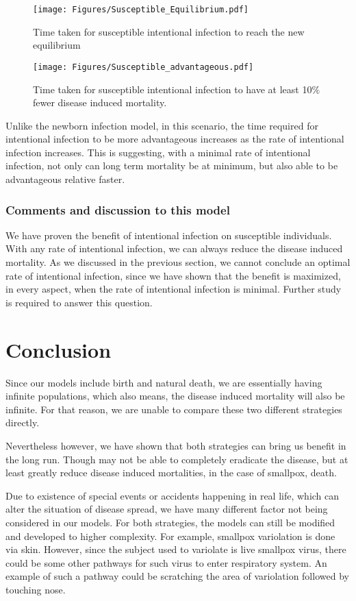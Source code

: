 \documentclass[12pt]{article}
\begin{document}
\begin{figure}[H]
  \centering
  \texttt{[image: Figures/Susceptible\_Equilibrium.pdf]}
  \caption{Time taken for susceptible intentional infection to reach the new equilibrium}
\end{figure}

\begin{figure}[H]
  \centering
  \texttt{[image: Figures/Susceptible\_advantageous.pdf]}
  \caption{Time taken for susceptible intentional infection to have at least 10$\%$ fewer disease induced mortality.}
\end{figure}

Unlike the newborn infection model, in this scenario, the time required for intentional infection to be more advantageous increases as the rate of intentional infection increases. This is suggesting, with a minimal rate of intentional infection, not only can long term mortality be at minimum, but also able to be advantageous relative faster.
\subsubsection{Comments and discussion to this model}
We have proven the benefit of intentional infection on susceptible individuals. With any rate of intentional infection, we can always reduce the disease induced mortality. As we discussed in the previous section, we cannot conclude an optimal rate of intentional infection, since we have shown that the benefit is maximized, in every aspect, when the rate of intentional infection is minimal. Further study is required to answer this question.
\section{Conclusion}
Since our models include birth and natural death, we are essentially having infinite populations, which also means, the disease induced mortality will also be infinite. For that reason, we are unable to compare these two different strategies directly.

Nevertheless however, we have shown that both strategies can bring us benefit in the long run. Though may not be able to completely eradicate the disease, but at least greatly reduce disease induced mortalities, in the case of smallpox, death.

Due to existence of special events or accidents happening in real life, which can alter the situation of disease spread, we have many different factor not being considered in our models. For both strategies, the models can still be modified and developed to higher complexity. For example, smallpox variolation is done via skin. However, since the subject used to variolate is live smallpox virus, there could be some other pathways for such virus to enter respiratory system. An example of such a pathway could be scratching the area of variolation followed by touching nose.
\end{document}
